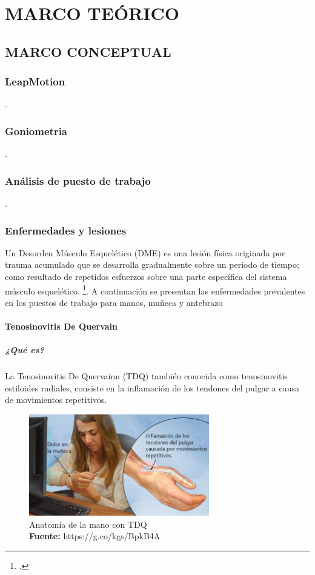 \chapter{MARCO TEÓRICO}
\section{MARCO CONCEPTUAL}
\subsection{LeapMotion}
.
\subsection{Goniometria}
.
\subsection{Análisis de puesto de trabajo}
.
\subsection{Enfermedades y lesiones}
 Un Desorden Músculo Esquelético (DME) es una lesión física originada por trauma acumulado que se desarrolla gradualmente sobre un período de tiempo; como resultado de repetidos esfuerzos sobre una parte específica del sistema músculo esquelético. \footcite[]{MinisterioCONTINUA}. A continuación se presentan las enfermedades prevalentes en los puestos de trabajo para manos, muñeca y antebrazo

\subsubsection{Tenosinovitis De Quervain}
\paragraph{¿Qué es?}
La Tenosinovitis De Quervainn (TDQ) también conocida como tenosinovitis estiloides radiales, consiste en la inflamación de los tendones del pulgar a causa de movimientos repetitivos.

\begin{figure}[H]
    \centering
    \includegraphics[width=0.7\textwidth]{Anexos/LATEX/chapters/images/TDQ.jpg}
    \caption{Anatomía de la mano con TDQ \\\textbf{Fuente:} https://g.co/kgs/BpkB4A}
    \label{TDQ}
\end{figure}

